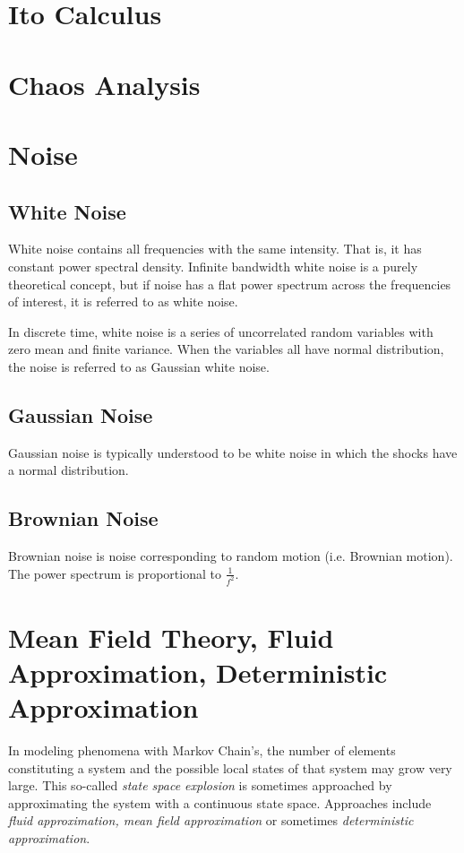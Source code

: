 \section{Ito Calculus}

\section{Chaos Analysis}

\section{Noise}

\subsection{White Noise}
White noise contains all frequencies with the same intensity. That is, it has constant power spectral density. Infinite bandwidth white noise is a purely theoretical concept, but if noise has a flat power spectrum across the frequencies of interest, it is referred to as white noise. 

In discrete time, white noise is a series of uncorrelated random variables with zero mean and finite variance. When the variables all have normal distribution, the noise is referred to as Gaussian white noise. 

\subsection{Gaussian Noise}
Gaussian noise is typically understood to be white noise in which the shocks have a normal distribution.

\subsection{Brownian Noise}
Brownian noise is noise corresponding to random motion (i.e. Brownian motion). The power spectrum is proportional to $\frac{1}{f^2}$.


\section{Mean Field Theory, Fluid Approximation, Deterministic Approximation}
In modeling phenomena with Markov Chain's, the number of elements constituting a system and the possible local states of that system may grow very large. This so-called \textit{state space explosion} is sometimes approached by approximating the system with a continuous state space. Approaches include \textit{fluid approximation, mean field approximation} or sometimes \textit{deterministic approximation}. 